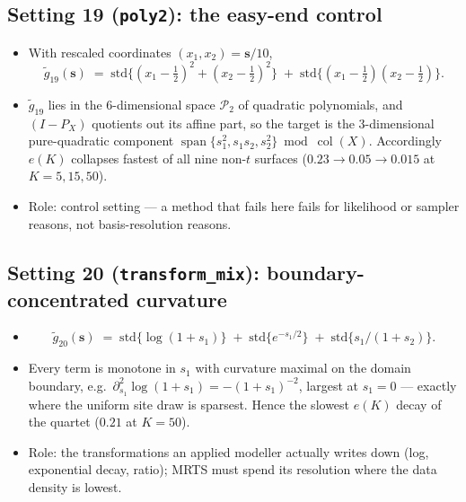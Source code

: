 \documentclass[11pt]{article}
\newcommand{\bs}{\boldsymbol{s}}
\begin{document}
\subsection*{Setting 19 (\texttt{poly2}): the easy-end control}

\begin{itemize}
\item With rescaled coordinates $(x_1, x_2) = \bs / 10$,
\begin{equation}
\tilde g_{19}(\bs) \;=\;
\mathrm{std}\big\{(x_1 - \tfrac12)^2 + (x_2 - \tfrac12)^2\big\}
\;+\; \mathrm{std}\big\{(x_1 - \tfrac12)(x_2 - \tfrac12)\big\}.
\label{eq:g19}
\end{equation}
\item $\tilde g_{19}$ lies in the 6-dimensional space $\mathcal P_2$ of
quadratic polynomials, and $(I - P_X)$ quotients out its affine part, so the
target is the 3-dimensional pure-quadratic component
$\operatorname{span}\{s_1^2, s_1 s_2, s_2^2\} \bmod \operatorname{col}(X)$.
Accordingly $e(K)$ collapses fastest of all nine non-$t$ surfaces
($0.23 \to 0.05 \to 0.015$ at $K = 5, 15, 50$).
\item Role: control setting --- a method that fails here fails for
likelihood or sampler reasons, not basis-resolution reasons.
\end{itemize}

\subsection*{Setting 20 (\texttt{transform\_mix}): boundary-concentrated
curvature}

\begin{itemize}
\item
\begin{equation}
\tilde g_{20}(\bs) \;=\; \mathrm{std}\{\log(1 + s_1)\}
\;+\; \mathrm{std}\{e^{-s_1/2}\}
\;+\; \mathrm{std}\{s_1 / (1 + s_2)\}.
\label{eq:g20}
\end{equation}
\item Every term is monotone in $s_1$ with curvature maximal on the domain
boundary, e.g.\ $\partial^2_{s_1} \log(1 + s_1) = -(1 + s_1)^{-2}$, largest
at $s_1 = 0$ --- exactly where the uniform site draw is sparsest. Hence the
slowest $e(K)$ decay of the quartet ($0.21$ at $K = 50$).
\item Role: the transformations an applied modeller actually writes down
(log, exponential decay, ratio); MRTS must spend its resolution where the
data density is lowest.
\end{itemize}
\end{document}
